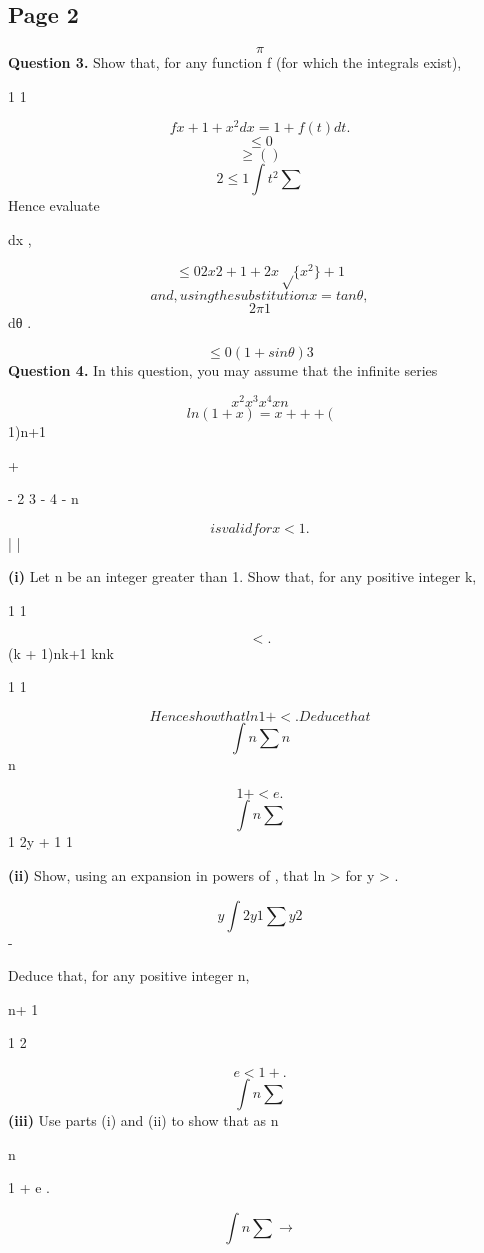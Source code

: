 \documentclass[12pt]{article}
\begin{document}
\subsection*{Page 2}
\begin{flushleft}
\[\pi\]
\bigskip\textbf{Question 3.} Show that, for any function f (for which the integrals exist),\par
\infty \infty\par
1 1\par
\[f x + 1 + x^2 dx = 1 + f(t) dt .\]
\[\leq0\]
\[\geq ( )\]
\[2 \leq1 \int t^2 \sum\]
Hence evaluate\par
\infty\par
dx ,\par
\[\leq0 2x2 + 1 + 2x\sqrt\{x^2\} + 1\]
\[and, using the substitution x = tan θ,\]
\[2 \pi 1\]
dθ .\par
\[\leq0 (1 + sin θ)3\]
\bigskip\textbf{Question 4.} In this question, you may assume that the infinite series\par
\[x^2 x^3 x^4 xn\]
\[ln(1 + x) = x + + + (\]
1)n+1\par
+\par
- 2 3 - 4 \cdots - n \cdots\par
\[is valid for x < 1.\]
| |\par
\textbf{(i)} Let n be an integer greater than 1. Show that, for any positive integer k,\par
1 1\par
\[< .\]
(k + 1)nk+1 knk\par
1 1\par
\[Hence show that ln 1 + < . Deduce that\]
\[\int n \sum n\]
n\par
\[1 + < e .\]
\[\int n \sum\]
1 2y + 1 1\par
\textbf{(ii)} Show, using an expansion in powers of , that ln > for y > .\par
\[y \int 2y 1 \sum y 2\]
-\par
Deduce that, for any positive integer n,\par
n+ 1\par
1 2\par
\[e < 1 + .\]
\[\int n \sum\]
\textbf{(iii)} Use parts (i) and (ii) to show that as n\par
\to \infty\par
n\par
1 + e .\par
\[\int n \sum \to\]
\end{flushleft}
\end{document}
